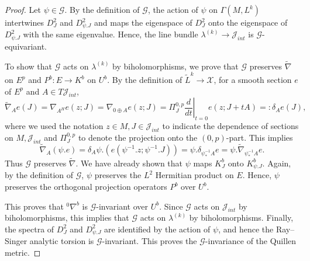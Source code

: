 \documentclass[10pt,a4paper]{amsart}
\theoremstyle{definition}
\theoremstyle{remark}
\begin{document}
\setcounter{section}{3}
\setcounter{equation}{8}
\setcounter{conj}{0}
\setcounter{definition}{3}
\setcounter{lemma}{0}
\setcounter{maindefn}{0}
\setcounter{mainlem}{0}
\setcounter{mainprop}{0}
\setcounter{mainthm}{2}
\setcounter{proposition}{1}
\setcounter{remark}{1}
\setcounter{theo}{0}
\setcounter{theorem}{2}
\begin{proof}
Let $\psi\in\mathcal{G}$. By the definition of $\mathcal{G}$, the action of $\psi$ on $\Gamma(M,L^k)$ intertwines $D^2_J$ and $D^2_{\psi.J}$ and maps the eigenspace of $D^2_J$ onto the eigenspace of $D^2_{\psi.J}$ with the same eigenvalue. Hence, the line bundle $\lambda^{(k)} \rightarrow \mathcal{J}_{int}$ is $\mathcal{G}$-equivariant. 

To show that $\mathcal{G}$ acts on $\lambda^{(k)}$ by biholomorphisms, we prove that $\mathcal{G}$ preserves $\widetilde{\nabla}$ on $E^p$ and $P^b:E\rightarrow K^b$ on $U^b$. By the definition of $\widetilde{L}^k\rightarrow\mathcal{X}$, for a smooth section $e$ of $E^p$ and $A\in T\mathcal{J}_{int}$,
\begin{equation*}
\widetilde{\nabla}_A e(J) = \nabla_{A^H} e(z;J)=\nabla_{0\oplus A}e(z;J)=\Pi_J^{0,p}\left.\frac{d}{dt}\right|_{t=0} e(z;J+tA)=:\delta_A e(J),
\end{equation*}
where we used the notation $z\in M, J\in \mathcal{J}_{int}$ to indicate the dependence of sections on $M,\mathcal{J}_{int}$ and $\Pi_J^{0,p}$ to denote the projection onto the $(0,p)$-part. This implies
\begin{equation*}
\widetilde{\nabla}_A (\psi.e)=\delta_A \psi.(e(\psi^{-1}.z;\psi^{-1}.J))=\psi. \delta_{\psi^{-1}_*A}e=\psi. \widetilde{\nabla}_{\psi^{-1}_*A}e.
\end{equation*}
Thus $\mathcal{G}$ preserves $\widetilde{\nabla}$. We have already shown that $\psi$ maps $K^b_J$ onto $K^b_{\psi.J}$. Again, by the definition of $\mathcal{G}$, $\psi$ preserves the $L^2$ Hermitian product on $E$. Hence, $\psi$ preserves the orthogonal projection operators $P^b$ over $U^b$. 

This proves that ${}^0\nabla^b$ is $\mathcal{G}$-invariant over $U^b$. Since $\mathcal{G}$ acts on $\mathcal{J}_{int}$ by biholomorphisms, this implies that $\mathcal{G}$ acts on $\lambda^{(k)}$ by biholomorphisms. Finally, the spectra of $D^2_J$ and $D^2_{\psi.J}$ are identified by the action of $\psi$, and hence the Ray--Singer analytic torsion is $\mathcal{G}$-invariant. This proves the $\mathcal{G}$-invariance of the Quillen metric.
\end{proof}
\end{document}
